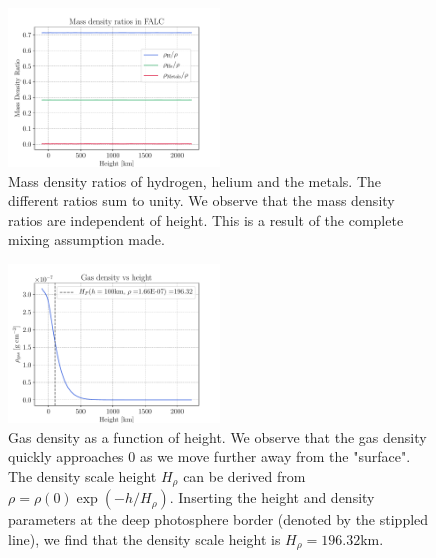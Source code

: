\documentclass[a4paper,11.5pt,]{article}
\begin{document}
\begin{multicols}{2}
\begin{figure}[H]
    \centering
    \includegraphics[width = 0.5\textwidth]{figures/1.2/FALCmassdensity.pdf}
    \caption{Mass density ratios of hydrogen, helium and the metals. The different ratios sum to unity. We observe that the mass density ratios are independent of height. This is a result of the complete mixing assumption made. }
    \label{fig: FALC abundance}
\end{figure}

\begin{figure}[H]
    \centering
    \includegraphics[width = 0.5\textwidth]{figures/1.2/FALCgasDensity.pdf}
    \caption{Gas density as a function of height. We observe that the gas density quickly approaches 0 as we move further away from the "surface". The density scale height $H_\rho$ can be derived from $\rho = \rho(0) \exp(-h/H_\rho)$. Inserting the height and density parameters at the deep photosphere border (denoted by the stippled line), we find that the density scale height is $H_\rho = 196.32$km.}
    \label{fig: FALC gasdens}
\end{figure}


\end{multicols}
\end{document}
